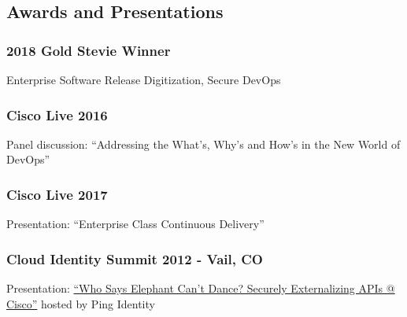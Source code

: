 \documentclass[
]{article}
\begin{document}
\subsection{Awards and Presentations}\label{awards-and-presentations}

\subsubsection{2018 Gold Stevie Winner}\label{gold-stevie-winner}

Enterprise Software Release Digitization, Secure DevOps

\subsubsection{Cisco Live 2016}\label{cisco-live-2016}

Panel discussion: ``Addressing the What's, Why's and How's in the New
World of DevOps''

\subsubsection{Cisco Live 2017}\label{cisco-live-2017}

Presentation: ``Enterprise Class Continuous Delivery''

\subsubsection{Cloud Identity Summit 2012 - Vail,
CO}\label{cloud-identity-summit-2012---vail-co}

Presentation:
\href{https://www.slideshare.net/slideshow/who-says-elephant-cant-dance/13698356?utm_source=clipboard_share_button&utm_campaign=slideshare_make_sharing_viral_v2&utm_variation=variant&utm_medium=share}{``Who
Says Elephant Can't Dance? Securely Externalizing APIs @ Cisco''} hosted
by Ping Identity
\end{document}
